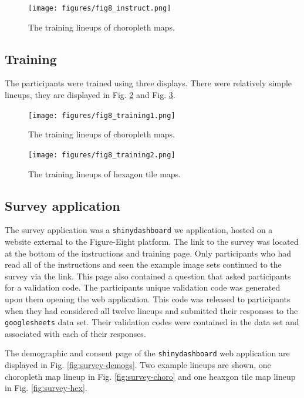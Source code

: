 \documentclass{monashthesis}
\begin{document}
\begin{figure}[H]
\centering
\texttt{[image: figures/fig8\_instruct.png]}
\caption{\label{fig:instruct}The training lineups of choropleth maps.}
\end{figure}

\hypertarget{training}{%
\subsection{Training}\label{training}}

The participants were trained using three displays. There were relatively simple lineups, they are displayed in Fig. \ref{fig:training1} and Fig. \ref{fig:training2}.

\begin{figure}[H]
\centering
\texttt{[image: figures/fig8\_training1.png]}
\caption{\label{fig:training1}The training lineups of choropleth maps.}
\end{figure}

\begin{figure}[H]
\centering
\texttt{[image: figures/fig8\_training2.png]}
\caption{\label{fig:training2}The training lineups of hexagon tile maps.}
\end{figure}

\hypertarget{survey-application}{%
\subsection{Survey application}\label{survey-application}}

The survey application was a \texttt{shinydashboard} we application, hosted on a website external to the Figure-Eight platform. The link to the survey was located at the bottom of the instructions and training page. Only participants who had read all of the instructions and seen the example image sets continued to the survey via the link.
This page also contained a question that asked participants for a validation code. The participants unique validation code was generated upon them opening the web application. This code was released to participants when they had considered all twelve lineups and submitted their responses to the \texttt{googlesheets} data set. Their validation codes were contained in the data set and associated with each of their responses.

The demographic and consent page of the \texttt{shinydashboard} web application are displayed in Fig. \ref{fig:survey-demogs}. Two example lineups are shown, one choropleth map lineup in Fig. \ref{fig:survey-choro} and one heaxgon tile map lineup in Fig. \ref{fig:survey-hex}.
\end{document}
